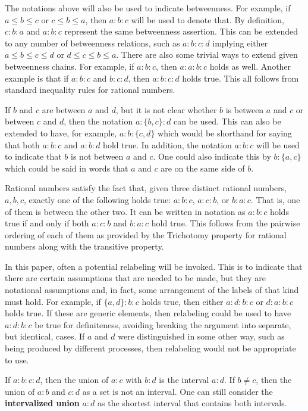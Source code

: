 \documentclass[12pt]{article}
\begin{document}
The notations above will also be used to indicate betweenness. For example, if $a \leq b \leq c$ or $c \leq b \leq a$, then $a:b:c$ will be used to denote that. By definition, $c:b:a$ and $a:b:c$ represent the same betweenness assertion. This can be extended to any number of betweenness relations, such as $a:b:c:d$ implying either $a \leq b \leq c \leq d$ or $d \leq c \leq b \leq a$. There are also some trivial ways to extend given betweenness chains. For example, if $a:b:c$, then $a:a:b:c$ holds as well. Another example is that if $a:b:c$ and $b:c:d$, then $a:b:c:d$ holds true. This all follows from standard inequality rules for rational numbers. 

If $b$ and $c$ are between $a$ and $d$, but it is not clear whether $b$ is between $a$ and $c$ or between $c$ and $d$, then the notation $a:\{b,c\}:d$ can be used. This can also be extended to have, for example, $a:b:\{c,d\}$ which would be shorthand for saying that both $a:b:c$ and $a:b:d$ hold true. In addition, the notation \sout{$a:b:c$} will be used to indicate that $b$ is not between $a$ and $c$. One could also indicate this by $b:\{a,c\}$ which could be said in words that $a$ and $c$ are on the same side of $b$. 

Rational numbers satisfy the fact that, given three distinct rational numbers, $a, b, c$, exactly one of the following holds true: $a:b:c$, $a:c:b$, or $b:a:c$. That is, one of them is between the other two. It can be written in notation as $a:b:c$ holds true if and only if both \sout{$a:c:b$} and \sout{$b:a:c$} hold true. This follows from the pairwise ordering of each of them as provided by the Trichotomy property for rational numbers along with the transitive property. 

In this paper, often a potential relabeling will be invoked. This is to indicate that there are certain assumptions that are needed to be made, but they are notational assumptions and, in fact, some arrangement of the labels of that kind must hold. For example, if $\{a,d\}:b:c$ holds true, then either $a:d:b:c$ or $d:a:b:c$ holds true. If these are generic elements, then relabeling could be used to have $a:d:b:c$  be  true for definiteness, avoiding breaking the argument into separate, but identical, cases. If $a$ and $d$ were distinguished in some other way, such as being produced by different processes, then relabeling would not be appropriate to use. 

If $a:b:c:d$, then the union of $a:c$ with $b:d$ is the interval $a:d$. If $b \neq c$, then the union of $a:b$ and $c:d$ as a set is not an interval. One can still consider the \textbf{intervalized union} $a:d$ as the shortest interval that contains both intervals. 
\end{document}
